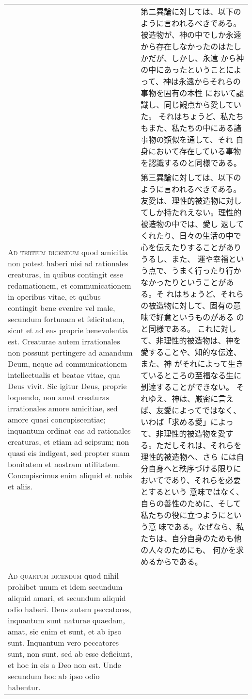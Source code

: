 \documentclass[10pt]{jsarticle} %
\begin{document}
\begin{longtable}{p{21em}p{21em}}
&

第二異論に対しては、以下のように言われるべきである。
被造物が、神の中でしか永遠から存在しなかったのはたしかだが、しかし、永遠
 から神の中にあったということによって、神は永遠からそれらの事物を固有の本性
 において認識し、同じ観点から愛していた。
それはちょうど、私たちもまた、私たちの中にある諸事物の類似を通して、それ
 自身において存在している事物を認識するのと同様である。

\\


{\scshape Ad tertium dicendum} quod amicitia non potest
haberi nisi ad rationales creaturas, in quibus contingit esse
redamationem, et communicationem in operibus vitae, et quibus contingit
bene evenire vel male, secundum fortunam et felicitatem, sicut et ad eas
proprie benevolentia est. Creaturae autem irrationales non possunt
pertingere ad amandum Deum, neque ad communicationem intellectualis et
beatae vitae, qua Deus vivit. Sic igitur Deus, proprie loquendo, non
amat creaturas irrationales amore amicitiae, sed amore quasi
concupiscentiae; inquantum ordinat eas ad rationales creaturas, et etiam
ad seipsum; non quasi eis indigeat, sed propter suam bonitatem et
nostram utilitatem. Concupiscimus enim aliquid et nobis et aliis.


&

第三異論に対しては、以下のように言われるべきである。
友愛は、理性的被造物に対してしか持たれえない。理性的被造物の中では、愛し
 返してくれたり、日々の生活の中で心を伝えたりすることがありうるし、また、
 運や幸福という点で、うまく行ったり行かなかったりということがある。そ
 れはちょうど、それらの被造物に対して、固有の意味で好意というものがある
 のと同様である。
これに対して、非理性的被造物は、神を愛することや、知的な伝達、また、神
 がそれによって生きているところの至福なる生に到達することができない。
それゆえ、神は、厳密に言えば、友愛によってではなく、いわば「求める愛」によっ
 て、非理性的被造物を愛する。ただしそれは、それらを理性的被造物へ、さら
 には自分自身へと秩序づける限りにおいてであり、それらを必要とするという
 意味ではなく、自らの善性のために、そして私たちの役に立つようにという意
 味である。なぜなら、私たちは、自分自身のためも他の人々のためにも、
 何かを求めるからである。


\\


{\scshape Ad quartum dicendum} quod nihil prohibet unum
et idem secundum aliquid amari, et secundum aliquid odio haberi. Deus
autem peccatores, inquantum sunt naturae quaedam, amat, sic enim et
sunt, et ab ipso sunt. Inquantum vero peccatores sunt, non sunt, sed ab
esse deficiunt, et hoc in eis a Deo non est. Unde secundum hoc ab ipso
odio habentur.



\end{longtable}
\end{document}
